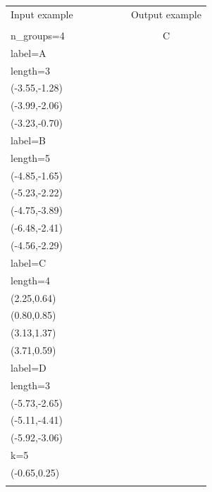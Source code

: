 \documentclass{article}
\begin{document}
\begin{table}[!ht]
    \begin{tabular}{|p{0.6\linewidth}|c|}
        \hline
        Input example & Output example\\
         & \\
        n\_groups=4 & C\\
        label=A & \\
        length=3 & \\
        (-3.55,-1.28) & \\
        (-3.99,-2.06) & \\
        (-3.23,-0.70) & \\
        label=B & \\
        length=5 & \\
        (-4.85,-1.65) & \\
        (-5.23,-2.22) & \\
        (-4.75,-3.89) & \\
        (-6.48,-2.41) & \\
        (-4.56,-2.29) & \\
        label=C & \\
        length=4 & \\
        (2.25,0.64) & \\
        (0.80,0.85) & \\
        (3.13,1.37) & \\
        (3.71,0.59) & \\
        label=D & \\
        length=3 & \\
        (-5.73,-2.65) & \\
        (-5.11,-4.41) & \\
        (-5.92,-3.06) & \\
        k=5 & \\
        (-0.65,0.25) & \\
         & \\
        \hline
   \end{tabular}
\end{table}
\end{document}
